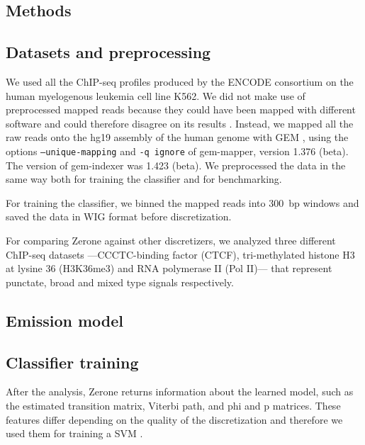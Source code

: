 \documentclass{bioinfo}
\begin{document}
\begin{methods}
\section{Methods}

\subsection{Datasets and preprocessing}
We used all the ChIP-seq profiles produced by the ENCODE consortium on the human
myelogenous leukemia cell line K562. We did not make use of preprocessed mapped
reads because they could have been mapped with different software and could
therefore disagree on its results \citep{Szalkowski2011}. Instead, we mapped all
the raw reads onto the hg19 assembly of the human genome with GEM
\citep{Marco-Sola2012}, using the options \texttt{--unique-mapping} and
\texttt{-q ignore} of gem-mapper, version 1.376 (beta). The version of
gem-indexer was 1.423 (beta). We preprocessed the data in the same
way both for training the classifier and for benchmarking.

For training the classifier, we binned the mapped reads into 300~bp windows and
saved the data in WIG format before discretization.

For comparing Zerone against other discretizers, we analyzed three different
ChIP-seq datasets ---CCCTC-binding factor (CTCF), tri-methylated histone H3 at
lysine 36 (H3K36me3) and RNA polymerase II (Pol II)--- that represent punctate,
broad and mixed type signals respectively.

\subsection{Emission model}

\subsection{Classifier training}
After the analysis, Zerone returns information about the learned model, such as
the estimated transition matrix, Viterbi path, and phi and p matrices. These
features differ depending on the quality of the discretization and therefore we
used them for training a SVM \citep{e1071}.


\end{methods}
\end{document}
